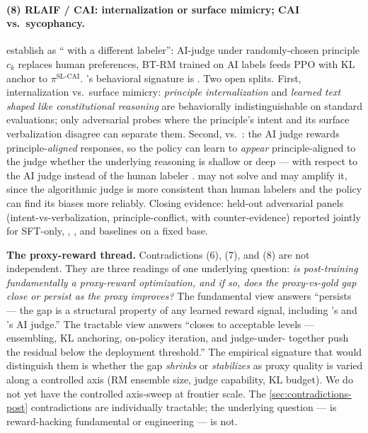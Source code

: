 \paragraph{(8) RLAIF / CAI: internalization or surface mimicry; CAI vs.\ sycophancy.}
\citet{bai2022-cai} establish  as `` with a different
labeler'': AI-judge under randomly-chosen principle $c_k$ replaces
human preferences, BT-RM trained on AI labels feeds PPO with KL
anchor to $\pi^{\text{SL-CAI}}$. 's behavioral signature is
. Two open splits. First, internalization vs.\ surface
mimicry: \emph{principle internalization} and \emph{learned
text shaped like constitutional reasoning} are behaviorally
indistinguishable on standard evaluations; only adversarial probes
where the principle's intent and its surface verbalization disagree
can separate them. Second,  vs.\ : the AI judge rewards
principle-\emph{aligned} responses, so the policy can learn to
\emph{appear} principle-aligned to the judge whether the underlying
reasoning is shallow or deep ---  with respect to the AI
judge instead of the human labeler \citep{sharma2023-sycophancy}.
 may not solve  and may amplify it, since the
algorithmic judge is more consistent than human labelers and the
policy can find its biases more reliably. Closing evidence:
held-out adversarial  panels (intent-vs-verbalization,
principle-conflict,  with counter-evidence) reported
jointly for SFT-only, , , and  baselines on a fixed base.

\begin{contradiction}
\textbf{The proxy-reward thread.} Contradictions (6), (7), and (8)
are not independent. They are three readings of one underlying
question: \emph{is post-training fundamentally a proxy-reward
optimization, and if so, does the proxy-vs-gold gap close or persist
as the proxy improves?} The fundamental view answers ``persists ---
the gap is a structural property of any learned reward signal,
including 's  and 's AI judge.'' The tractable
view answers ``closes to acceptable levels --- ensembling,
KL anchoring, on-policy iteration, and judge-under-
together push the residual below the deployment threshold.'' The
empirical signature that would distinguish them is whether the gap
\emph{shrinks} or \emph{stabilizes} as proxy quality is varied along
a controlled axis (RM ensemble size, judge capability, KL budget).
We do not yet have the controlled axis-sweep at frontier scale. The
\cref{sec:contradictions-post} contradictions are individually
tractable; the underlying question --- is reward-hacking fundamental
or engineering --- is not.
\end{contradiction}

